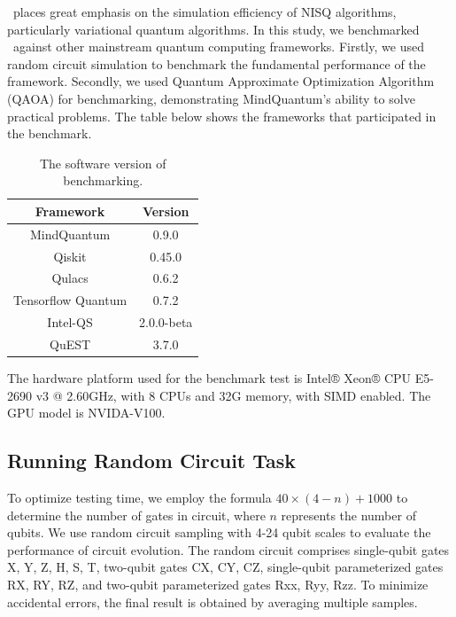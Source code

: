 \MindQuantum\ places great emphasis on the simulation efficiency of NISQ algorithms, particularly variational quantum algorithms. In this study, we benchmarked \MindQuantum\ against other mainstream quantum computing frameworks. Firstly, we used random circuit simulation to benchmark the fundamental performance of the framework. Secondly, we used Quantum Approximate Optimization Algorithm (QAOA) for benchmarking, demonstrating MindQuantum’s ability to solve practical problems. The table below shows the frameworks that participated in the benchmark.

\begin{table}[ht]
    \begin{tabular}{cc}
        \toprule
        Framework           & Version       \\
        \midrule
        MindQuantum         & 0.9.0         \\
        Qiskit              & 0.45.0        \\
        Qulacs              & 0.6.2         \\
        Tensorflow Quantum  & 0.7.2         \\
        Intel-QS            & 2.0.0-beta    \\
        QuEST               & 3.7.0         \\
        \bottomrule
    \end{tabular}
    \caption{The software version of benchmarking.}
    \label{tab:software version}
\end{table}

The hardware platform used for the benchmark test is Intel® Xeon® CPU E5-2690 v3 @ 2.60GHz, with 8 CPUs and 32G memory, with SIMD enabled. The GPU model is NVIDA-V100.

\subsection{Running Random Circuit Task}

To optimize testing time, we employ the formula $40 \times (4−n)+1000$ to determine the number of gates in circuit, where $n$ represents the number of qubits. We use random circuit sampling with 4-24 qubit scales to evaluate the performance of circuit evolution. The random circuit comprises single-qubit gates X, Y, Z, H, S, T, two-qubit gates CX, CY, CZ, single-qubit parameterized gates RX, RY, RZ, and two-qubit parameterized gates Rxx, Ryy, Rzz. To minimize accidental errors, the final result is obtained by averaging multiple samples.

